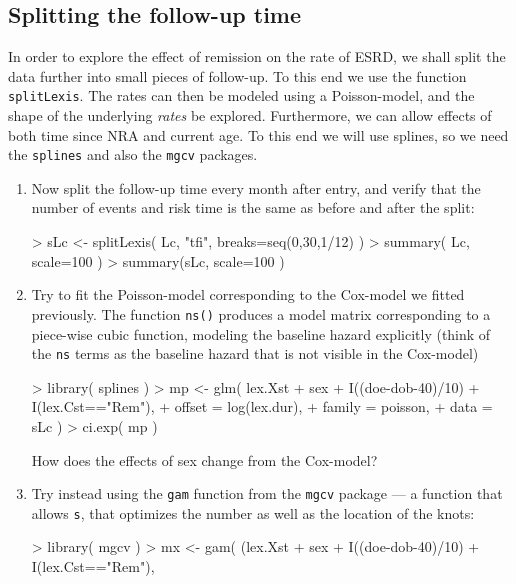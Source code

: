 \subsection{Splitting the follow-up time}
In order to explore the effect of remission on the rate of ESRD, we
shall split the data further into small pieces of follow-up. To this
end we use the function \texttt{splitLexis}. The rates can then be
modeled using a Poisson-model, and the shape of the underlying
\emph{rates} be explored. Furthermore, we can allow effects of both
time since NRA and current age. To this end we will use splines, so we
need the \texttt{splines} and also the \texttt{mgcv} packages.
\begin{enumerate}[resume]
\item Now split the follow-up time every month after entry, and verify
  that the number of events and risk time is the same as before and
  after the split:
\begin{Schunk}
\begin{Sinput}
> sLc <- splitLexis( Lc, "tfi", breaks=seq(0,30,1/12) )
> summary( Lc, scale=100 )
> summary(sLc, scale=100 )
\end{Sinput}
\end{Schunk}
\item Try to fit the Poisson-model corresponding to the Cox-model
  we fitted previously. The function \texttt{ns()} produces a model
  matrix corresponding to a piece-wise cubic function, modeling the
  baseline hazard explicitly (think of the \texttt{ns} terms as the
  baseline hazard that is not visible in the Cox-model)
\begin{Schunk}
\begin{Sinput}
> library( splines )
> mp <- glm( lex.Xst %in% EP ~ ns( tfi, df=4 ) +
+            sex + I((doe-dob-40)/10) + I(lex.Cst=="Rem"),
+            offset = log(lex.dur),
+            family = poisson, 
+              data = sLc )
> ci.exp( mp )
\end{Sinput}
\end{Schunk}
  How does the effects of sex change from the Cox-model?
\item Try instead using the \texttt{gam} function from the
  \texttt{mgcv} package --- a function that allows \texttt{s}, that
  optimizes the number as well as the location of the knots:
\begin{Schunk}
\begin{Sinput}
> library( mgcv )
> mx <- gam( (lex.Xst %in% EP) ~ s( tfi, k=10 ) +
+            sex + I((doe-dob-40)/10) + I(lex.Cst=="Rem"),

\end{Sinput}
\end{Schunk}
\end{enumerate}
